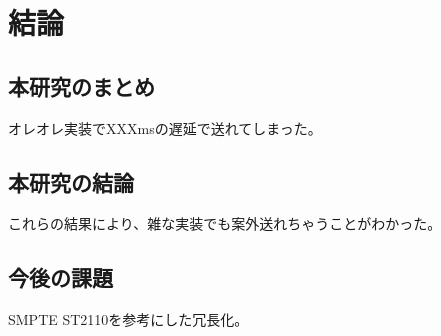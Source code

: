 \chapter{結論}
\label{chap:conclusion}

\section{本研究のまとめ}
\label{section:conclusion}

オレオレ実装でXXXmsの遅延で送れてしまった。

\section{本研究の結論}

これらの結果により、雑な実装でも案外送れちゃうことがわかった。

\section{今後の課題}

SMPTE ST2110を参考にした冗長化。
